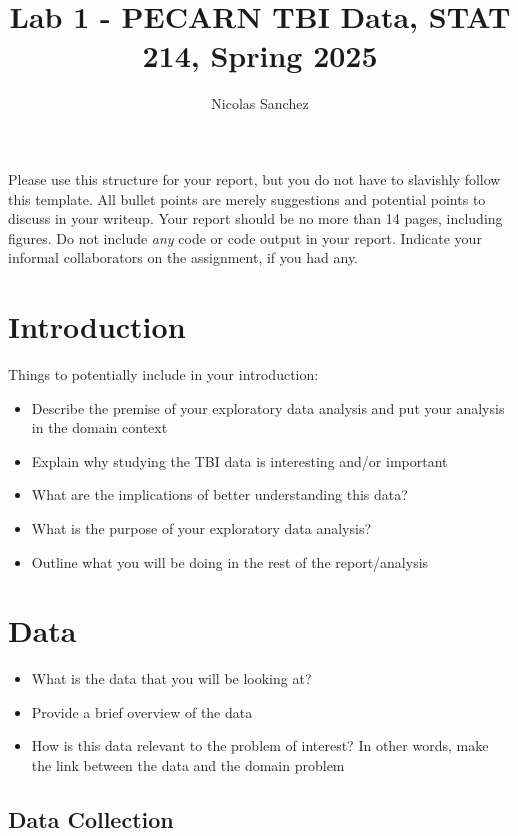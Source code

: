 \documentclass[10pt,letterpaper]{article}
\title{Lab 1 - PECARN TBI Data, STAT 214, Spring 2025}
\author{Nicolas Sanchez}
\begin{document}
\maketitle

Please use this structure for your report, but you do not have to
slavishly follow this template. All bullet points are merely suggestions
and potential points to discuss in your writeup. Your report should be
no more than 14 pages, including figures. Do not include \emph{any} code
or code output in your report. Indicate your informal collaborators on
the assignment, if you had any.

\section{Introduction}\label{introduction}

Things to potentially include in your introduction:

\begin{itemize}
\item Describe the premise of your exploratory data analysis and put your analysis in the domain context
\item Explain why studying the TBI data is interesting and/or important
\item What are the implications of better understanding this data?
\item What is the purpose of your exploratory data analysis?
\item Outline what you will be doing in the rest of the report/analysis
\end{itemize}


\section{Data}\label{data}

\begin{itemize}
\item What is the data that you will be looking at?
\item Provide a brief overview of the data
\item How is this data relevant to the problem of interest? In other words, make the link between the data and the domain problem
\end{itemize}

\subsection{Data Collection}\label{data-collection}
\end{document}
